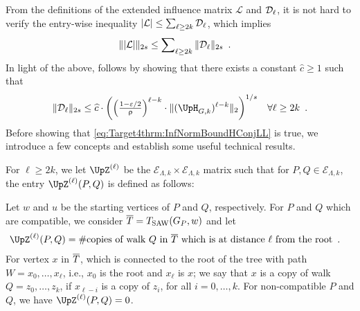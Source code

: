 \documentclass[11pt,reqno]{amsart}
\numberwithin{equation}{section}
\newcommand{\cE}{{\mathcal{E}}}
\newcommand{\cL}{{\mathcal{L}}}
\newcommand{\applegreen}[1]{ {\color{applegreen}#1}}
\newcommand{\amethyst}[1]{{\color{amethyst}#1} }
\newcommand{\blue}[1]{{\color{blue}#1}}
\newcommand{\bluepigment}[1]{{\color{blue(pigment)}#1}}
\newcommand{\capri}[1]{{\color{capri}#1}}
\newcommand{\cadmiumgreen}[1]{{\color{cadmiumgreen}#1}}
\newcommand{\darkmagenta}[1]{{\color{darkmagenta}#1}}
\newcommand{\goldenbrown}[1]{{\color{goldenbrown}#1}}
\newcommand{\heliotrope}[1]{{\color{heliotrope}#1}}
\newcommand{\iris}[1]{{\color{iris}#1}}
\newcommand{\red}[1]{{\color{red}#1}}
\newcommand{\rosegold}[1]{{\color{rosegold}#1}}
\newcommand{\ExtV}{\iris{\cE}}
\newcommand{\pfs}{\darkmagenta{s}}
\newcommand{\Tsaw}{T_{\rm SAW}}
\newcommand{\norm}[2]{\goldenbrown{\|} #1 \goldenbrown{\|}_{#2}}
\newcommand{\abs}[1]{\blue{|}#1\blue{|}}
\newcommand{\NBMatrix}{\cadmiumgreen{\UpH}_{G,\kk}}
\renewcommand{\applegreen}[1]{#1}
\renewcommand{\amethyst}[1]{#1}
\renewcommand{\blue}[1]{#1}
\renewcommand{\bluepigment}[1]{#1}
\renewcommand{\capri}[1]{#1}
\renewcommand{\cadmiumgreen}[1]{#1}
\renewcommand{\darkmagenta}[1]{#1}
\renewcommand{\goldenbrown}[1]{#1}
\renewcommand{\heliotrope}[1]{#1}
\renewcommand{\iris}[1]{#1}
\renewcommand{\red}[1]{#1}
\renewcommand{\rosegold}[1]{#1}
\newcommand{\ki}{\capri{i}}
\newcommand{\kk}{\bluepigment{k}}
\newcommand{\kell}{{\color{green(pigment)}\ell}}%
\newcommand{\kP}{\goldenbrown{P}}
\newcommand{\kQ}{\amethyst{Q}}
\newcommand{\ku}{\red{u}}
\newcommand{\kW}{\blue{W}}
\newcommand{\kw}{\blue{w}}
\newcommand{\kx}{\heliotrope{x}}
\newcommand{\kz}{\cadmiumgreen{z}}
\renewcommand{\ki}{i}
\renewcommand{\kk}{k}
\renewcommand{\kell}{\ell}
\renewcommand{\kP}{P}
\renewcommand{\kQ}{Q}
\renewcommand{\ku}{u}
\renewcommand{\kW}{W}
\renewcommand{\kw}{w}
\renewcommand{\kx}{x}
\renewcommand{\kz}{z}
\newcommand{\ExtdInfMatrix}{\rosegold{\cL}}
\newcommand{\SingBound}{\uprho}
\begin{document}
From the definitions of the extended influence matrix $\ExtdInfMatrix$ and $ \ExtdInfMatrixL_{\kell}$, it is not hard to 
verify the entry-wise inequality   $\abs{\ExtdInfMatrix} \leq \sum\nolimits_{\kell\geq 2\kk} \ExtdInfMatrixL_{\kell}$, which
%
implies 
\begin{align}\nonumber 
\norm{ \abs{\ExtdInfMatrix}}{2\pfs} &
% 
\leq \sum\nolimits_{\kell\geq 2\kk} \norm{ \ExtdInfMatrixL_{\kell}}{2\pfs}\enspace.
\end{align}
%
In light of the above,  follows by showing that there exists a constant 
$\widehat{c}\geq 1$ such that
%
\begin{align}\label{eq:Target4thrm:InfNormBoundHConjLL}
\norm{ \ExtdInfMatrixL_{\kell}}{2\pfs} &\leq \widehat{c} \cdot \left(
 {\textstyle \left(\frac{1-\varepsilon/2}{\SingBound}\right)^{\kell-\kk}} \cdot 
\norm{ (\NBMatrix)^{{\kell-\kk}}}{2}
 \right)^{1/\pfs} & \forall \kell\geq 2\kk \enspace.
\end{align}
%
Before showing that \eqref{eq:Target4thrm:InfNormBoundHConjLL} is true,
we introduce a few concepts and establish some useful technical results. 



For $\kell\geq 2\kk$, we let $\TAdj^{(\kell)}$ be the $\ExtV_{\Lambda,\kk}\times \ExtV_{\Lambda,\kk}$ 
matrix such that for $\kP,\kQ \in \ExtV_{\Lambda,\kk}$, the entry $\TAdj^{(\kell)}(\kP,\kQ)$ is defined 
as follows: 



Let $\kw$ and $\ku$ be the starting vertices of $\kP$ and $\kQ$, respectively. For $\kP$ and 
$\kQ$ which are compatible,   we consider $\TPP=\Tsaw(\gext{G}{\kP}, \kw)$ and let 
%
\begin{align}\nonumber
\TAdj^{(\kell)}(\kP, \kQ) &=\# \textrm{copies of walk $\kQ$ in $\TPP$ which is at distance $\kell$ from the root} \enspace. 
\end{align}
For vertex $\kx$ in $\overline{T}$, which is connected to the root of the tree with path  $\kW=\kx_0, \ldots, \kx_{\kell}$, i.e., $\kx_0$ 
is the root and $\kx_{\kell}$ is $\kx$; we say that $\kx$ is  a copy of walk $\kQ=\kz_0,\ldots, \kz_{\kk}$, if $\kx_{\kell-\ki}$ is a copy of 
$\kz_{\ki}$, for all $\ki=0,\ldots, \kk$. 
%
 For non-compatible $\kP$ and $\kQ$, we have $\TAdj^{(\kell)}(\kP, \kQ) =0$. 
\end{document}
